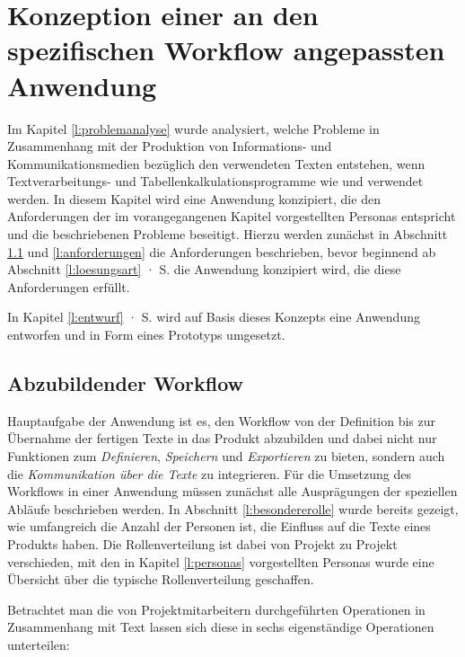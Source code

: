 \section{Konzeption einer an den spezifischen Workflow angepassten Anwendung}\label{l:konzeption}

Im Kapitel \ref{l:problemanalyse} wurde analysiert, welche Probleme in Zusammenhang mit der Produktion von Informations- und Kommunikationsmedien bezüglich den verwendeten Texten entstehen, wenn Textverarbeitungs- und Tabellenkalkulationsprogramme wie  und  verwendet werden. In diesem Kapitel wird eine Anwendung konzipiert, die den Anforderungen der im vorangegangenen Kapitel vorgestellten Personas entspricht und die beschriebenen Probleme beseitigt. Hierzu werden zunächst in Abschnitt \ref{l:workflow} und \ref{l:anforderungen} die Anforderungen beschrieben, bevor beginnend ab Abschnitt \ref{l:loesungsart} · S.\pageref{l:loesungsart} die Anwendung konzipiert wird, die diese Anforderungen erfüllt. 

\bigskip

In Kapitel \ref{l:entwurf} · S.\pageref{l:entwurf} wird auf Basis dieses Konzepts eine Anwendung entworfen und in Form eines Prototyps umgesetzt.

\subsection{Abzubildender Workflow}\label{l:workflow}

Hauptaufgabe der Anwendung ist es, den Workflow von der Definition bis zur Übernahme der fertigen Texte in das Produkt abzubilden und dabei nicht nur Funktionen zum \emph{Definieren}, \emph{Speichern} und \emph{Exportieren} zu bieten, sondern auch die \emph{Kommunikation über die Texte} zu integrieren. Für die Umsetzung des Workflows in einer Anwendung müssen zunächst alle Ausprägungen der speziellen Abläufe beschrieben werden. In Abschnitt \ref{l:besondererolle} wurde bereits gezeigt, wie umfangreich die Anzahl der Personen ist, die Einfluss auf die Texte eines Produkts haben. Die Rollenverteilung ist dabei von Projekt zu Projekt verschieden, mit den in Kapitel \ref{l:personas} vorgestellten Personas wurde eine Übersicht über die typische Rollenverteilung geschaffen. 

Betrachtet man die von Projektmitarbeitern durchgeführten Operationen in Zusammenhang mit Text lassen sich diese in sechs eigenständige Operationen unterteilen:

